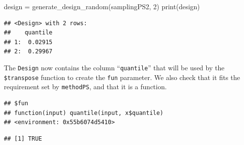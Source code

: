 \documentclass[
]{scrbook}
\newenvironment{Shaded}{\begin{snugshade}}{\end{snugshade}}
\newcommand{\DecValTok}[1]{\textcolor[rgb]{0.00,0.00,0.81}{#1}}
\newcommand{\FunctionTok}[1]{\textcolor[rgb]{0.00,0.00,0.00}{#1}}
\newcommand{\NormalTok}[1]{#1}
\newcommand{\OtherTok}[1]{\textcolor[rgb]{0.56,0.35,0.01}{#1}}
\newcommand{\SpecialCharTok}[1]{\textcolor[rgb]{0.00,0.00,0.00}{#1}}
\renewenvironment{Shaded} {\begin{snugshade}\small} {\end{snugshade}}
\begin{document}
\begin{Shaded}
\begin{Highlighting}[]
\NormalTok{design }\OtherTok{=} \FunctionTok{generate\_design\_random}\NormalTok{(samplingPS2, }\DecValTok{2}\NormalTok{)}
\FunctionTok{print}\NormalTok{(design)}
\end{Highlighting}
\end{Shaded}

\begin{verbatim}
## <Design> with 2 rows:
##    quantile
## 1:  0.02915
## 2:  0.29967
\end{verbatim}

The \texttt{Design} now contains the column ``\texttt{quantile}'' that will be used by the \texttt{\$transpose} function to create the \texttt{fun} parameter.
We also check that it fits the requirement set by \texttt{methodPS}, and that it is a function.

\begin{Shaded}
\end{Shaded}

\begin{verbatim}
## $fun
## function(input) quantile(input, x$quantile)
## <environment: 0x55b6074d5410>
\end{verbatim}

\begin{Shaded}
\end{Shaded}

\begin{verbatim}
## [1] TRUE
\end{verbatim}

\begin{Shaded}
\end{Shaded}
\end{document}
